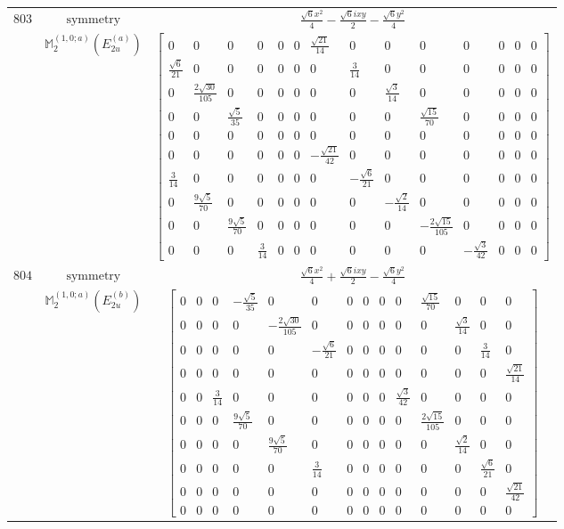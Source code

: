 \documentclass[fleqn,8pt,landscape]{jsarticle}
\begin{document}
\begin{longtable}{ccc}
$ 803 $ & $ \text{symmetry} $ & $ \frac{\sqrt{6} x^{2}}{4} - \frac{\sqrt{6} i x y}{2} - \frac{\sqrt{6} y^{2}}{4} $ \\
$  $ & $ \mathbb{M}_{2}^{(1,0;a)}(E_{2u}^{(a)}) $ & $ \begin{bmatrix} 0 & 0 & 0 & 0 & 0 & 0 & \frac{\sqrt{21}}{14} & 0 & 0 & 0 & 0 & 0 & 0 & 0 \\ \frac{\sqrt{6}}{21} & 0 & 0 & 0 & 0 & 0 & 0 & \frac{3}{14} & 0 & 0 & 0 & 0 & 0 & 0 \\ 0 & \frac{2 \sqrt{30}}{105} & 0 & 0 & 0 & 0 & 0 & 0 & \frac{\sqrt{3}}{14} & 0 & 0 & 0 & 0 & 0 \\ 0 & 0 & \frac{\sqrt{5}}{35} & 0 & 0 & 0 & 0 & 0 & 0 & \frac{\sqrt{15}}{70} & 0 & 0 & 0 & 0 \\ 0 & 0 & 0 & 0 & 0 & 0 & 0 & 0 & 0 & 0 & 0 & 0 & 0 & 0 \\ 0 & 0 & 0 & 0 & 0 & 0 & - \frac{\sqrt{21}}{42} & 0 & 0 & 0 & 0 & 0 & 0 & 0 \\ \frac{3}{14} & 0 & 0 & 0 & 0 & 0 & 0 & - \frac{\sqrt{6}}{21} & 0 & 0 & 0 & 0 & 0 & 0 \\ 0 & \frac{9 \sqrt{5}}{70} & 0 & 0 & 0 & 0 & 0 & 0 & - \frac{\sqrt{2}}{14} & 0 & 0 & 0 & 0 & 0 \\ 0 & 0 & \frac{9 \sqrt{5}}{70} & 0 & 0 & 0 & 0 & 0 & 0 & - \frac{2 \sqrt{15}}{105} & 0 & 0 & 0 & 0 \\ 0 & 0 & 0 & \frac{3}{14} & 0 & 0 & 0 & 0 & 0 & 0 & - \frac{\sqrt{3}}{42} & 0 & 0 & 0 \end{bmatrix} $ \\ \hline
$ 804 $ & $ \text{symmetry} $ & $ \frac{\sqrt{6} x^{2}}{4} + \frac{\sqrt{6} i x y}{2} - \frac{\sqrt{6} y^{2}}{4} $ \\
$  $ & $ \mathbb{M}_{2}^{(1,0;a)}(E_{2u}^{(b)}) $ & $ \begin{bmatrix} 0 & 0 & 0 & - \frac{\sqrt{5}}{35} & 0 & 0 & 0 & 0 & 0 & 0 & \frac{\sqrt{15}}{70} & 0 & 0 & 0 \\ 0 & 0 & 0 & 0 & - \frac{2 \sqrt{30}}{105} & 0 & 0 & 0 & 0 & 0 & 0 & \frac{\sqrt{3}}{14} & 0 & 0 \\ 0 & 0 & 0 & 0 & 0 & - \frac{\sqrt{6}}{21} & 0 & 0 & 0 & 0 & 0 & 0 & \frac{3}{14} & 0 \\ 0 & 0 & 0 & 0 & 0 & 0 & 0 & 0 & 0 & 0 & 0 & 0 & 0 & \frac{\sqrt{21}}{14} \\ 0 & 0 & \frac{3}{14} & 0 & 0 & 0 & 0 & 0 & 0 & \frac{\sqrt{3}}{42} & 0 & 0 & 0 & 0 \\ 0 & 0 & 0 & \frac{9 \sqrt{5}}{70} & 0 & 0 & 0 & 0 & 0 & 0 & \frac{2 \sqrt{15}}{105} & 0 & 0 & 0 \\ 0 & 0 & 0 & 0 & \frac{9 \sqrt{5}}{70} & 0 & 0 & 0 & 0 & 0 & 0 & \frac{\sqrt{2}}{14} & 0 & 0 \\ 0 & 0 & 0 & 0 & 0 & \frac{3}{14} & 0 & 0 & 0 & 0 & 0 & 0 & \frac{\sqrt{6}}{21} & 0 \\ 0 & 0 & 0 & 0 & 0 & 0 & 0 & 0 & 0 & 0 & 0 & 0 & 0 & \frac{\sqrt{21}}{42} \\ 0 & 0 & 0 & 0 & 0 & 0 & 0 & 0 & 0 & 0 & 0 & 0 & 0 & 0 \end{bmatrix} $ \\ \hline

\end{longtable}
\end{document}
